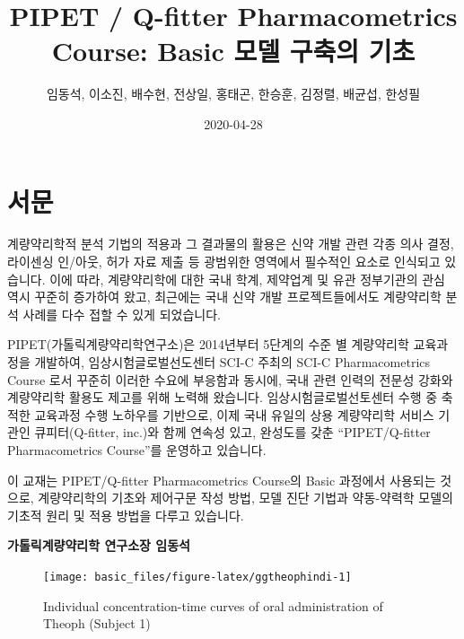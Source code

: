 \documentclass[
  10pt,
]{krantz}
\title{PIPET / Q-fitter Pharmacometrics Course: Basic 모델 구축의 기초}
\author{임동석, 이소진, 배수현, 전상일, 홍태곤, 한승훈, 김정렬, 배균섭, 한성필}
\date{2020-04-28}
\begin{document}
\maketitle

\thispagestyle{empty}
\begin{center}
\end{center}

\setlength{\abovedisplayskip}{-5pt}
\setlength{\abovedisplayshortskip}{-5pt}

{
\hypersetup{linkcolor=}
\setcounter{tocdepth}{2}
\tableofcontents
}
\listoftables
\listoffigures
\hypertarget{uxc11cuxbb38}{%
\chapter*{서문}\label{uxc11cuxbb38}}


계량약리학적 분석 기법의 적용과 그 결과물의 활용은 신약 개발 관련 각종 의사 결정, 라이센싱 인/아웃, 허가 자료 제출 등 광범위한 영역에서 필수적인 요소로 인식되고 있습니다. 이에 따라, 계량약리학에 대한 국내 학계, 제약업계 및 유관 정부기관의 관심 역시 꾸준히 증가하여 왔고, 최근에는 국내 신약 개발 프로젝트들에서도 계량약리학 분석 사례를 다수 접할 수 있게 되었습니다.

PIPET(가톨릭계량약리학연구소)은 2014년부터 5단계의 수준 별 계량약리학 교육과정을 개발하여, 임상시험글로벌선도센터 SCI-C 주최의 SCI-C Pharmacometrics Course 로서 꾸준히 이러한 수요에 부응함과 동시에, 국내 관련 인력의 전문성 강화와 계량약리학 활용도 제고를 위해 노력해 왔습니다. 임상시험글로벌선토센터 수행 중 축적한 교육과정 수행 노하우를 기반으로, 이제 국내 유일의 상용 계량약리학 서비스 기관인 큐피터(Q-fitter, inc.)와 함께 연속성 있고, 완성도를 갖춘 ``PIPET/Q-fitter Pharmacometrics Course''를 운영하고 있습니다.

이 교재는 PIPET/Q-fitter Pharmacometrics Course의 Basic 과정에서 사용되는 것으로, 계량약리학의 기초와 제어구문 작성 방법, 모델 진단 기법과 약동-약력학 모델의 기초적 원리 및 적용 방법을 다루고 있습니다.

\textbf{가톨릭계량약리학 연구소장 임동석}

\begin{figure}
\texttt{[image: basic\_files/figure-latex/ggtheophindi-1]} \caption{Individual concentration-time curves of oral administration of Theoph (Subject 1)}\label{fig:ggtheophindi}
\end{figure}
\end{document}
